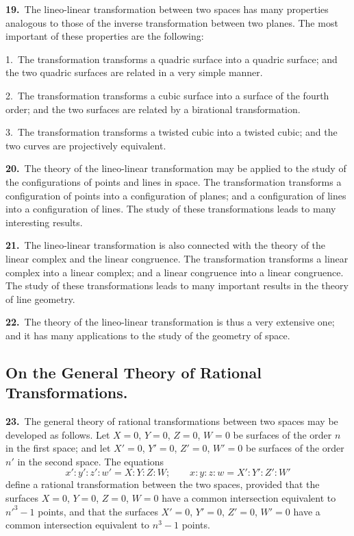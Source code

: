 \documentclass[11pt,a4paper]{article}
\begin{document}
\textbf{19.}\ The lineo-linear transformation between two spaces has many properties analogous to those of the inverse transformation between two planes. The most important of these properties are the following:

1.\ The transformation transforms a quadric surface into a quadric surface; and the two quadric surfaces are related in a very simple manner.

2.\ The transformation transforms a cubic surface into a surface of the fourth order; and the two surfaces are related by a birational transformation.

3.\ The transformation transforms a twisted cubic into a twisted cubic; and the two curves are projectively equivalent.

\newpage
\setcounter{page}{196}

\noindent\textbf{20.}\ The theory of the lineo-linear transformation may be applied to the study of the configurations of points and lines in space. The transformation transforms a configuration of points into a configuration of planes; and a configuration of lines into a configuration of lines. The study of these transformations leads to many interesting results.

\textbf{21.}\ The lineo-linear transformation is also connected with the theory of the linear complex and the linear congruence. The transformation transforms a linear complex into a linear complex; and a linear congruence into a linear congruence. The study of these transformations leads to many important results in the theory of line geometry.

\textbf{22.}\ The theory of the lineo-linear transformation is thus a very extensive one; and it has many applications to the study of the geometry of space.

\subsection*{On the General Theory of Rational Transformations.}

\textbf{23.}\ The general theory of rational transformations between two spaces may be developed as follows. Let $X = 0$, $Y = 0$, $Z = 0$, $W = 0$ be surfaces of the order $n$ in the first space; and let $X' = 0$, $Y' = 0$, $Z' = 0$, $W' = 0$ be surfaces of the order $n'$ in the second space. The equations
\[
x' : y' : z' : w' = X : Y : Z : W;\qquad x : y : z : w = X' : Y' : Z' : W'
\]
define a rational transformation between the two spaces, provided that the surfaces $X = 0$, $Y = 0$, $Z = 0$, $W = 0$ have a common intersection equivalent to $n'^3 - 1$ points, and that the surfaces $X' = 0$, $Y' = 0$, $Z' = 0$, $W' = 0$ have a common intersection equivalent to $n^3 - 1$ points.
\end{document}

